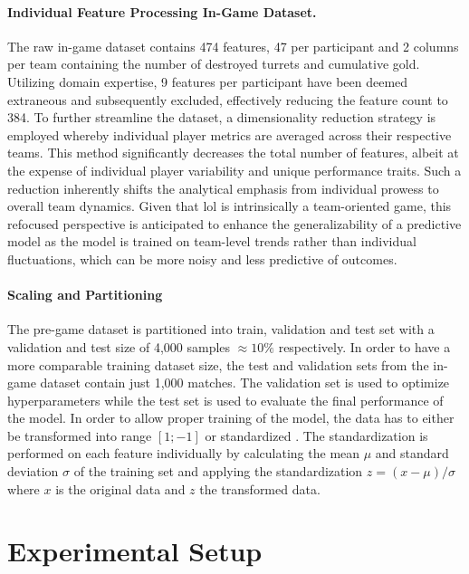 \documentclass[12pt, a4paper, headinclude, twoside, plainheadsepline, open=right, numbers=noenddot, hidelinks, toc=listof, toc=bibliography]{scrreprt}
\begin{document}
\paragraph{Individual Feature Processing In-Game Dataset.}
The raw in-game dataset contains 474 features, 47 per participant and 2 columns per team containing the number of destroyed turrets and cumulative gold.
Utilizing domain expertise, 9 features per participant have been deemed extraneous and subsequently excluded, effectively reducing the feature count to 384. 
To further streamline the dataset, a dimensionality reduction strategy is employed whereby individual player metrics are averaged across their respective teams.
This method significantly decreases the total number of features, albeit at the expense of individual player variability and unique performance traits.
Such a reduction inherently shifts the analytical emphasis from individual prowess to overall team dynamics. 
Given that \ac{lol} is intrinsically a team-oriented game, this refocused perspective is anticipated to enhance the generalizability of a predictive model as the model is trained on team-level trends rather than individual fluctuations, which can be more noisy and less predictive of outcomes.

\paragraph{Scaling and Partitioning}
The pre-game dataset is partitioned into train, validation and test set with a validation and test size of 4,000 samples $ \approx 10\%$ respectively.
In order to have a more comparable training dataset size, the test and validation sets from the in-game dataset contain just 1,000 matches.
The validation set is used to optimize hyperparameters while the test set is used to evaluate the final performance of the model.
In order to allow proper training of the model, the data has to either be transformed into range $[1;-1]$ or standardized \cite{shankerEffectDataStandardization1996}.
The standardization is performed on each feature individually by calculating the mean $\mu$ and standard deviation $\sigma$ of the training set and applying the standardization $z = (x - \mu) / \sigma$ where $x$ is the original data and $z$ the transformed data.


\section{Experimental Setup}
\label{sec:exper_setup}
\end{document}

